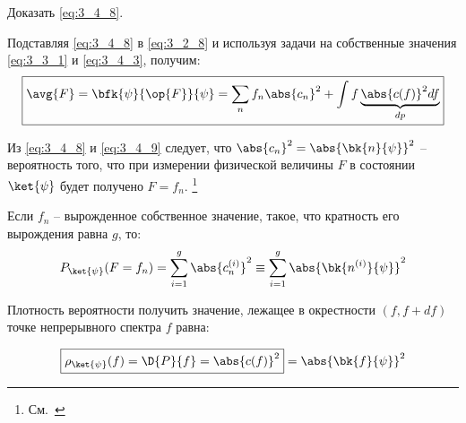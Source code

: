 \begin{excr}
Доказать \eqref{eq:3_4_8}.
\end{excr}

Подставляя \eqref{eq:3_4_8} в \eqref{eq:3_2_8} и используя задачи на собственные значения \eqref{eq:3_3_1} и \eqref{eq:3_4_3}, получим:
\begin{equation}
\label{eq:3_4_9}
\boxed {
	\avg{F} = \bfk{\psi}{\op{F}}{\psi} = \sum_n f_n \abs{c_n}^2 + \int f \underbrace{\abs{c(f)}^2 df}_{dp}
}
\end{equation}

Из \eqref{eq:3_4_8} и \eqref{eq:3_4_9} следует, что $\abs{c_n}^2 = \abs{\bk{n}{\psi}}^2$ -- вероятность того, что при измерении физической величины $F$ в состоянии $\ket{\psi}$ будет получено $F = f_n$. \footnote{См.~}

Если $f_n$ -- вырожденное собственное значение, такое, что кратность его вырождения равна $g$, то:
\begin{equation}
\label{eq:3_4_10}
P_{\ket{\psi}}(F = f_n) = \sum_{i=1}^{g} \abs{c_n^{(i)}}^2 \equiv \sum_{i=1}^{g} \abs{ \bk{n^{(i)}}{\psi} }^2
\end{equation}

Плотность вероятности получить значение, лежащее в окрестности $(f, f + df)$ точке непрерывного спектра $f$ равна:

\begin{equation}
\label{eq:3_4_11}
\boxed {
	\rho_{\ket{\psi}}(f) = \D{P}{f} = \abs{c(f)}^2
} = \abs{\bk{f}{\psi}}^2
\end{equation}
